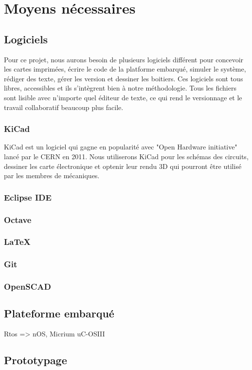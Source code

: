 \section{Moyens nécessaires}

\subsection{Logiciels}
Pour ce projet, nous aurons besoin de plusieurs logiciels différent pour concevoir les cartes imprimées, écrire le code de la platforme embarqué, simuler le système, rédiger des texte, gérer les version et dessiner les boitiers. Ces logiciels sont tous libres, accessibles et ils s'intègrent bien à notre méthodologie. Tous les fichiers sont lisible avec n'importe quel éditeur de texte, ce qui rend le versionnage et le travail collaboratif beaucoup plus facile.\\

\subsubsection{KiCad}
KiCad est un logiciel qui gagne en popularité avec "Open Hardware initiative" lancé par le CERN en 2011. Nous utiliserons KiCad pour les schémas des circuits, dessiner les carte électronique et optenir
leur rendu 3D qui pourront être utilisé par les membres de mécaniques.

\subsubsection{Eclipse IDE}


\subsubsection{Octave}


\subsubsection{LaTeX}


\subsubsection{Git}


\subsubsection{OpenSCAD}



\subsection{Plateforme embarqué}
Rtos => nOS, Micrium uC-OSIII

\subsection{Prototypage}

\subsection{}
\subsection{}
\subsection{}